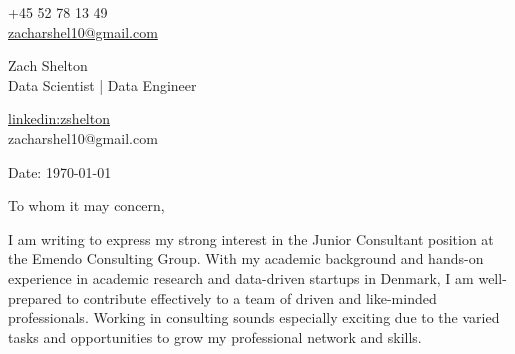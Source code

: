\documentclass[11pt,a4]{article}
\begin{document}
\begin{center}
    \begin{minipage}[b]{0.24\textwidth}
            \large +45 52 78 13 49 \\
            \large \href{mailto:zacharshel10@gmail.com}{zacharshel10@gmail.com} 
    \end{minipage}%
    \begin{minipage}[b]{0.5\textwidth}
            \centering
            {\Huge Zach Shelton} \\ %
            \vspace{0.1cm}
            {\color{UI_blue} \Large{Data Scientist | Data Engineer}} \\
    \end{minipage}%
    \begin{minipage}[b]{0.24\textwidth}
            \flushright \large
            {\href{https://www.linkedin.com/in/zshelton/}{linkedin:zshelton} } \\
            zacharshel10@gmail.com
    \end{minipage}   
    
\vspace{-0.15cm} 
{\color{UI_blue} \hrulefill}
\end{center}

\justify
\setlength{\parindent}{0pt}
\setlength{\parskip}{12pt}
\vspace{0.1cm}


Date: \today \par \vspace{-0.1cm}

To whom it may concern,

I am writing to express my strong interest in the Junior Consultant position at the Emendo Consulting Group. With my academic background and hands-on experience in academic research and data-driven startups in Denmark, I am well-prepared to contribute effectively to a team of driven and like-minded professionals. Working in consulting sounds especially exciting due to the varied tasks and opportunities to grow my professional network and skills.
\end{document}
